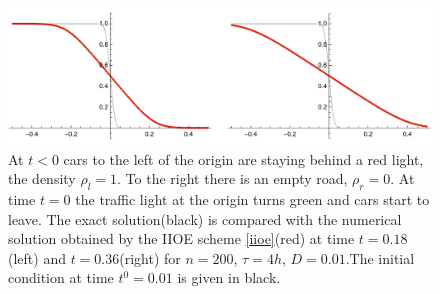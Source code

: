 \documentclass[../include.tex]{subfiles}
\begin{document}
\begin{figure}[h!]
	\centering
	\includegraphics[width=.99\textwidth]{figures/traffic_Rare_200_4h}
	\caption{At $ t<0 $ cars to the left of the origin are staying behind a red light, the density $ \rho_l = 1 $. To the right there is an empty road, $ \rho_r = 0 $. At time $ t = 0 $ the traffic light at the origin turns green and cars start to leave. The exact solution(black) is compared with the numerical solution obtained by the IIOE scheme \eqref{iioe}(red) at time $ t = 0.18 $(left) and $ t = 0.36 $(right) for $ n = 200 $, $ \tau = 4h $, $ D = 0.01 $.The initial condition at time $ t^0 = 0.01 $ is given in black.}
	\label{fig:traffic_rare}
\end{figure}
\newpage
\end{document}
